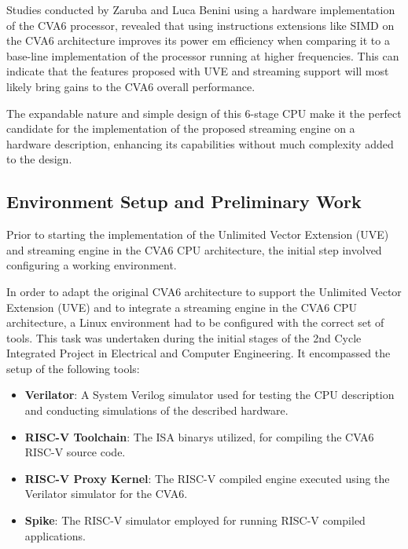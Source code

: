 Studies conducted by Zaruba and Luca Benini \cite{8777130} using a hardware implementation of the CVA6 processor, revealed that using instructions extensions like SIMD on the CVA6 architecture improves its power em efficiency when comparing it to a base-line implementation of the processor running at higher frequencies. This can indicate that the features proposed with UVE and streaming support will most likely bring gains to the CVA6 overall performance.


The expandable nature and simple design of this 6-stage CPU make it the perfect candidate for the implementation of the proposed streaming engine on a hardware description, enhancing its capabilities without much complexity added to the design.




\subsection{Environment Setup and Preliminary Work}

Prior to starting the implementation of the Unlimited Vector Extension (UVE) and streaming engine in the CVA6 CPU architecture, the initial step involved configuring a working environment.

In order to adapt the original CVA6 architecture to support the Unlimited Vector Extension (UVE) and to integrate a streaming engine in the CVA6 CPU architecture, a Linux environment had to be configured with the correct set of tools.  This task was undertaken during the initial stages of the 2nd Cycle Integrated Project in Electrical and Computer Engineering. It encompassed the setup of the following tools:
\begin{itemize}
    \item \textbf{Verilator}\cite{Verilator, Verilator-Doc}: A System Verilog simulator used for testing the CPU description and conducting simulations of the described hardware.
    \item \textbf{RISC-V Toolchain}\cite{RV-Doc}: The ISA  binarys utilized, for compiling the CVA6 RISC-V source code.
    \item \textbf{RISC-V Proxy Kernel}\cite{RV-PK}: The RISC-V compiled engine executed using the Verilator simulator for the CVA6.
    \item \textbf{Spike}\cite{Spike}: The RISC-V simulator employed for running RISC-V compiled applications.
\end{itemize}


